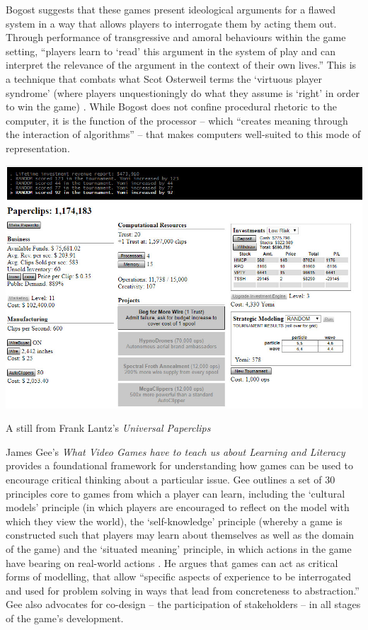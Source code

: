 \documentclass[nofonts,nols,justified,nobib]{tufte-book}
\begin{document}
Bogost suggests that these games present ideological arguments for a flawed system in a way that allows players to interrogate them by acting them out. Through performance of transgressive and amoral behaviours within the game setting, ``players learn to `read' this argument in the system of play and can interpret the relevance of the argument in the context of their own lives.''\cite{bogost_rhetoric_2008} This is a technique that combats what Scot Osterweil terms the `virtuous player syndrome' (where players unquestioningly do what they assume is `right' in order to win the game) \cite{osterweil_civic_2011}. While Bogost does not confine procedural rhetoric to the computer, it is the function of the processor -- which ``creates meaning through the interaction of algorithms'' -- that makes computers well-suited to this mode of representation.

\begin{marginfigure}
\includegraphics[width=\textwidth]{img/1/universal-paperclips-progress.jpg}
\caption{A still from Frank Lantz's \emph{Universal Paperclips} \cite{lantz_universal_2017}}
\end{marginfigure}

James Gee's \emph{What Video Games have to teach us about Learning and Literacy} provides a foundational framework for understanding how games can be used to encourage critical thinking about a particular issue. Gee outlines a set of 30 principles core to games from which a player can learn, including the `cultural models' principle (in which players are encouraged to reflect on the model with which they view the world), the `self-knowledge' principle (whereby a game is constructed such that players may learn about themselves as well as the domain of the game) and the `situated meaning' principle, in which actions in the game have bearing on real-world actions \cite{gee_what_2004}. He argues that games can act as critical forms of modelling, that allow ``specific aspects of experience to be interrogated and used for problem solving in ways that lead from concreteness to abstraction.'' Gee also advocates for co-design -- the participation of stakeholders -- in all stages of the game's development.
\end{document}
